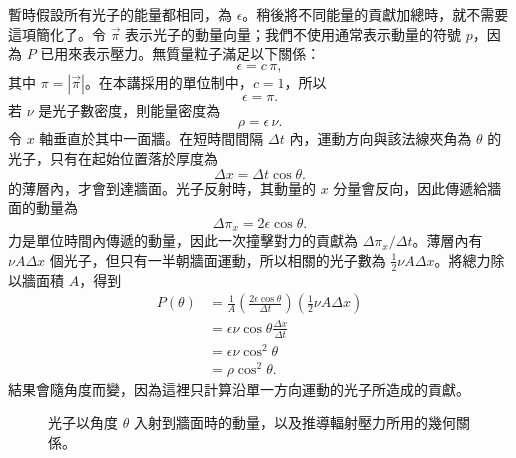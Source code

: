 暫時假設所有光子的能量都相同，為 \(\epsilon\)。稍後將不同能量的貢獻加總時，就不需要這項簡化了。令 \(\vec{\pi}\) 表示光子的動量向量；我們不使用通常表示動量的符號 \(p\)，因為 \(P\) 已用來表示壓力。無質量粒子滿足以下關係：
\begin{equation}
\epsilon=c\,\pi,
\end{equation}
其中 \(\pi=|\vec{\pi}|\)。在本講採用的單位制中，\(c=1\)，所以
\begin{equation}
\epsilon=\pi.
\end{equation}
若 \(\nu\) 是光子數密度，則能量密度為
\begin{equation}
\rho=\epsilon\,\nu.
\end{equation}
令 \(x\) 軸垂直於其中一面牆。在短時間間隔 \(\Delta t\) 內，運動方向與該法線夾角為 \(\theta\) 的光子，只有在起始位置落於厚度為
\begin{equation}
\Delta x=\Delta t\cos\theta.
\end{equation}
的薄層內，才會到達牆面。光子反射時，其動量的 \(x\) 分量會反向，因此傳遞給牆面的動量為
\begin{equation}
\Delta \pi_x=2\epsilon\cos\theta.
\end{equation}
力是單位時間內傳遞的動量，因此一次撞擊對力的貢獻為 \(\Delta \pi_x/\Delta t\)。薄層內有 \(\nu A\Delta x\) 個光子，但只有一半朝牆面運動，所以相關的光子數為 \(\tfrac12 \nu A\Delta x\)。將總力除以牆面積 \(A\)，得到
\begin{align}
P(\theta)
&=
\frac{1}{A}
\left(\frac{2\epsilon\cos\theta}{\Delta t}\right)
\left(\frac12 \nu A\Delta x\right) \\
&=
\epsilon\nu\cos\theta\frac{\Delta x}{\Delta t} \\
&=
\epsilon\nu\cos^2\theta \\
&=
\rho\cos^2\theta.
\end{align}
結果會隨角度而變，因為這裡只計算沿單一方向運動的光子所造成的貢獻。

\begin{figure}[htbp]
\centering
{}
\caption{光子以角度 \(\theta\) 入射到牆面時的動量，以及推導輻射壓力所用的幾何關係。}
\label{fig:c05-photon-pressure}
\end{figure}

